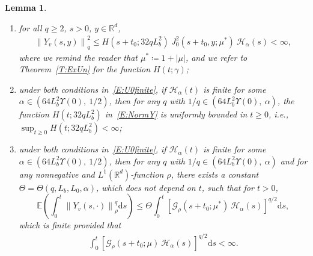 \documentclass[a4paper,11pt]{article}%
\theoremstyle{plain}
\newtheorem{lemma}[theorem]{Lemma}
\theoremstyle{definition}
\numberwithin{equation}{section}
\newcommand{\R}{\mathbb{R}}
\newcommand{\E}{\mathbb{E}}
\newcommand{\Norm}[1]{\left\| #1 \right\|}
\newcommand{\ud}{\ensuremath{\mathrm{d}}}
\begin{document}
\begin{lemma}
  \begin{enumerate}[(1)]
    \item for all $q\ge 2$, $s>0$, $y\in\R^d$,
      \begin{align}\label{E:NormY}
        \Norm{Y_v(s,y)}_q^2 \le H\left(s+t_0;32qL_b^2\right) \: J_0^2 (s + t_0,y;\mu^*)\: \mathcal{H}_\alpha(s)<\infty,
      \end{align}
      where we remind the reader that $\mu^* \coloneqq 1 + |\mu|$, and we refer to
      Theorem~\ref{T:ExUn} for the function $H\left(t;\gamma\right)$;
    \item under both conditions in~\eqref{E:U0finite}, if $\mathcal{H}_\alpha(t)$ is finite for some
      $\alpha\in \left(64 L_b^2 \Upsilon(0),\: 1/2\right)$, then for any $q$ with $1/q\in \left(64
      L_b^2 \Upsilon(0), \: \alpha\right)$, the function $H\left(t;32qL_b^2\right)$
      in~\eqref{E:NormY} is uniformly bounded in $t\ge 0$, i.e., $\sup_{t\ge
      0}H\left(t;32qL_b^2\right)<\infty$;
    \item under both conditions in~\eqref{E:U0finite}, if $\mathcal{H}_\alpha(t)$ is finite for some
      $\alpha\in \left(64 L_b^2 \Upsilon(0),\: 1/2\right)$, then for any $q$ with $1/q\in \left(64
      L_b^2 \Upsilon(0), \: \alpha\right)$ and for any nonnegative and $L^1 (\R^d)$-function $\rho$,
      there exists a constant $\Theta = \Theta\left(q,L_b,L_0,\alpha\right)$, which does not depend
      on $t$, such that for $t>0$,
      \begin{equation}\label{E:yineq}
        \E \left(\int_0^{t} \Norm{Y_v(s,\cdot)}_{\rho}^q \ud s\right)
        \le \Theta \int_0^t \left[\mathcal{G}_{\rho}(s + t_0;\mu^*)\: \mathcal{H}_\alpha(s)\right]^{q/2} \ud s,
      \end{equation}
      which is finite provided that
    \begin{align}\label{E:GH-int'}
      \int_{0}^t \left[\mathcal{G}_{\rho}(s + t_0;\mu)\:\mathcal{H}_\alpha(s)\right]^{q/2} \ud s <\infty.
    \end{align}
  \end{enumerate}
\end{lemma}
\end{document}
